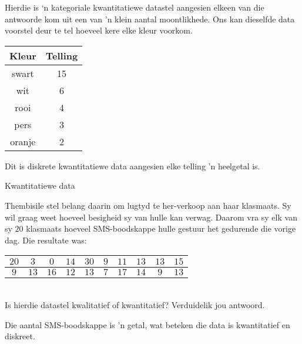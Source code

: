Hierdie is ‘n kategoriale kwantitatiewe datastel aangesien elkeen van die antwoorde kom uit een van ’n klein aantal moontlikhede. Ons kan dieselfde data voorstel deur te tel hoeveel kere elke kleur voorkom.

  \begin{center}
    \begin{tabular}{|c|c|}\hline
      
      \textbf{Kleur} & \textbf{Telling} \\ \hline

      swart & 15 \\
      wit & 6 \\
      rooi & 4 \\
      pers & 3 \\
      oranje & 2\\
    \hline
    \end{tabular}
  \end{center}

  Dit is diskrete kwantitatiewe data aangesien elke telling 'n heelgetal is.

\begin{wex}{Kwantitatiewe data}
{Thembisile stel belang daarin om lugtyd te her-verkoop aan haar klasmaats. Sy wil graag weet hoeveel besigheid sy van hulle kan verwag. Daarom vra sy elk van sy $20$ klasmaats hoeveel SMS-boodskappe hulle gestuur het gedurende die vorige dag. Die resultate was:
\\

    \begin{center}
      \begin{tabular}{|c|c|c|c|c|c|c|c|c|c|}\hline
        $20$ & $ 3$ & $ 0$ & $14$ & $30$ & $9$ & $11$ & $13$ & $13$ & $15$ \\ \hline
         $9$ & $13$ & $16$ & $12$ & $13$ & $7$ & $17$ & $14$ & $ 9$ & $13$ \\ \hline
        
      \end{tabular}
    \end{center}
    \vspace{8pt}\\

    Is hierdie datastel kwalitatief of kwantitatief? Verduidelik jou antwoord.
}{

  Die aantal SMS-boodskappe is 'n getal, wat beteken die data is kwantitatief en diskreet.
}
\end{wex}

